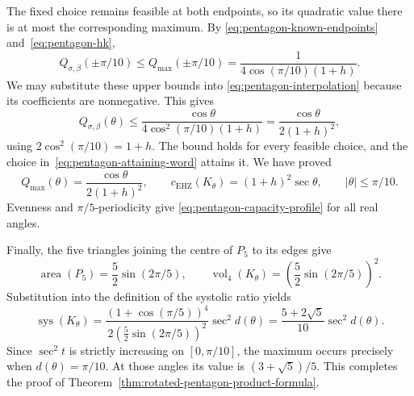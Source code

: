 The fixed choice remains feasible at both endpoints, so its quadratic
value there is at most the corresponding maximum. By
\eqref{eq:pentagon-known-endpoints} and~\eqref{eq:pentagon-hk},
\[
 Q_{\sigma,\beta}(\pm\pi/10)
 \le Q_{\max}(\pm\pi/10)
 =\frac1{4\cos(\pi/10)(1+h)}.
\]
We may substitute these upper bounds into
\eqref{eq:pentagon-interpolation} because its coefficients are
nonnegative. This gives
\[
 Q_{\sigma,\beta}(\theta)
 \le\frac{\cos\theta}{4\cos^2(\pi/10)(1+h)}
 =\frac{\cos\theta}{2(1+h)^2},
\]
using $2\cos^2(\pi/10)=1+h$. The bound holds for every feasible
choice, and the choice in~\eqref{eq:pentagon-attaining-word} attains it.
We have proved
\[
 Q_{\max}(\theta)=\frac{\cos\theta}{2(1+h)^2},\qquad
 c_{\mathrm{EHZ}}(K_\theta)=(1+h)^2\sec\theta,
 \qquad |\theta|\le\pi/10.
\]
Evenness and $\pi/5$-periodicity give
\eqref{eq:pentagon-capacity-profile} for all real angles.

Finally, the five triangles joining the centre of $P_5$ to its edges
give
\[
 \operatorname{area}(P_5)=\frac52\sin(2\pi/5),\qquad
 \operatorname{vol}_4(K_\theta)=\left(\frac52\sin(2\pi/5)\right)^2.
\]
Substitution into the definition of the systolic ratio yields
\[
 \operatorname{sys}(K_\theta)
 =\frac{(1+\cos(\pi/5))^4}
        {2\left(\frac52\sin(2\pi/5)\right)^2}\sec^2 d(\theta)
 =\frac{5+2\sqrt5}{10}\sec^2 d(\theta).
\]
Since $\sec^2 t$ is strictly increasing on $[0,\pi/10]$, the maximum
occurs precisely when $d(\theta)=\pi/10$. At those angles its value is
$(3+\sqrt5)/5$. This completes the proof of
Theorem~\ref{thm:rotated-pentagon-product-formula}.

